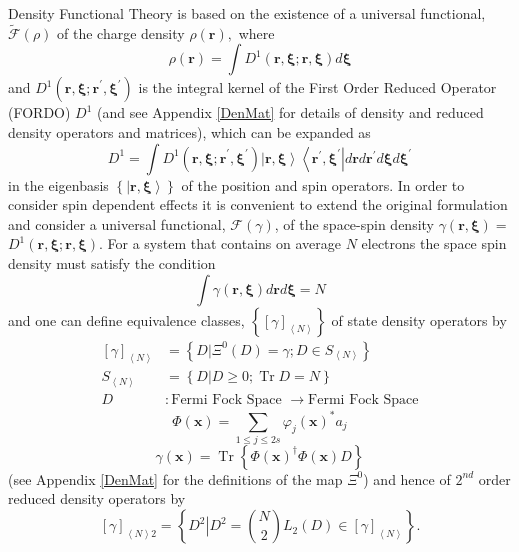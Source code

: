 \documentclass[aps,preprint]{revtex4}%
\begin{document}
\bigskip Density Functional Theory is based on the existence of a universal
functional, $\mathcal{\tilde{F}}\left(  \rho\right)  $ \cite{HK} of the charge
density $\rho\left(  \mathbf{r}\right)  ,$ where
\begin{equation}
\rho\left(  \mathbf{r}\right)  =\int D^{1}\left(  \mathbf{r,\xi;r,\xi}\right)
d\mathbf{\xi}%
\end{equation}
and $D^{1}\left(  \mathbf{r,\xi;r}^{\prime}\mathbf{,\xi}^{\prime}\right)  $ is
the integral kernel of the First Order Reduced Operator (FORDO) $D^{1}$
\cite{Coleman} (and see Appendix \ref{DenMat} for details of density and
reduced density operators and matrices), which can be expanded as
\begin{equation}
D^{1}=\int D^{1}\left(  \mathbf{r,\xi;r}^{\prime}\mathbf{,\xi}^{\prime
}\right)  \left\vert \mathbf{r,\xi}\right\rangle \left\langle \mathbf{r}%
^{\prime}\mathbf{,\xi}^{\prime}\right\vert d\mathbf{r}d\mathbf{r}^{\prime
}d\mathbf{\xi}d\mathbf{\xi}^{\prime}%
\end{equation}
in the eigenbasis $\left\{  \left\vert \mathbf{r,\xi}\right\rangle \right\}  $
of the position and spin operators. In order to consider spin dependent
effects it is convenient to extend the original formulation and consider a
universal functional, $\mathcal{F}\left(  \gamma\right)  $, of the space-spin
density $\gamma\left(  \mathbf{r,\xi}\right)  =$ $D^{1}\left(  \mathbf{r,\xi
;r,\xi}\right)  .$ For a system that contains on average $N$ electrons the
space spin density must satisfy the condition
\begin{equation}
\int\gamma\left(  \mathbf{r,\xi}\right)  d\mathbf{r}d\mathbf{\xi}=N
\end{equation}
and one can define equivalence classes, $\left\{  \left[  \gamma\right]
_{\left\langle N\right\rangle }\right\}  $ of state density operators by
\begin{align*}
\left[  \gamma\right]  _{\left\langle N\right\rangle }  &  =\left\{  \left.
D\right\vert \Xi^{0}\left(  D\right)  =\gamma;D\in S_{\left\langle
N\right\rangle }\right\} \\
S_{\left\langle N\right\rangle }  &  =\left\{  \left.  D\right\vert
D\geq0;\operatorname{Tr}D=N\right\} \\
D  &  :\text{Fermi Fock Space }\rightarrow\text{Fermi Fock Space}%
\end{align*}%
\[
\Phi\left(  \mathbf{x}\right)  =\sum_{1\leq j\leq2s}\varphi_{j}\left(
\mathbf{x}\right)  ^{\ast}a_{j}%
\]%
\[
\gamma\left(  \mathbf{x}\right)  =\operatorname{Tr}\left\{  \Phi\left(
\mathbf{x}\right)  ^{\dagger}\Phi\left(  \mathbf{x}\right)  D\right\}
\]
(see Appendix \ref{DenMat} for the definitions of the map $\Xi^{0}$) and hence
of $2^{nd}$ order reduced density operators by
\[
\left[  \gamma\right]  _{\left\langle N\right\rangle 2}=\left\{  \left.
D^{2}\right\vert D^{2}=\binom{N}{2}L_{2}\left(  D\right)  \in\left[
\gamma\right]  _{\left\langle N\right\rangle }\right\}  .
\]
\end{document}
